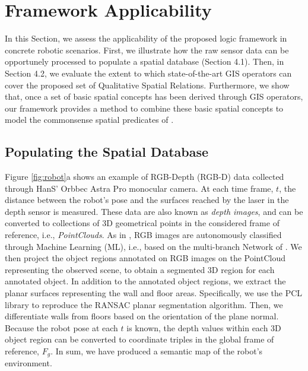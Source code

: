 \documentclass{article}
\begin{document}
\section{Framework Applicability}
In this Section, we assess the applicability of the proposed logic framework in concrete robotic scenarios. First, we illustrate how the raw sensor data can be opportunely processed to populate a spatial database (Section 4.1). Then, in Section 4.2, we evaluate the extent to which state-of-the-art GIS operators can cover the proposed set of Qualitative Spatial Relations. Furthermore, we show that, once a set of basic spatial concepts has been derived through GIS operators, our framework provides a method to combine these basic spatial concepts to model the commonsense spatial predicates of \cite{landau_what_1993}. 

\subsection{Populating the Spatial Database}
Figure \ref{fig:robot}a shows an example of RGB-Depth (RGB-D) data collected through HanS' Orbbec Astra Pro monocular camera. %
At each time frame, $t$, the distance between the robot's pose and the surfaces reached by the laser in the depth sensor is measured. These data are also known as \textit{depth images}, and can be converted to collections of 3D geometrical points in the considered frame of reference, i.e., \textit{PointClouds}. %
As in \cite{chiatti2021aaaimake}, RGB images are autonomously classified through Machine Learning (ML), i.e., based on the multi-branch Network of \cite{zeng2018robotic}. We then project the object regions annotated on RGB images on the PointCloud representing the observed scene, to obtain a segmented 3D region for each annotated object. 
In addition to the annotated object regions, we extract the planar surfaces representing the wall and floor areas. Specifically, we use the PCL library \cite{rusu2011pcl} to reproduce the RANSAC planar segmentation algorithm. Then, we differentiate walls from floors based on the orientation of the plane normal. 
Because the robot pose at each $t$ is known, the depth values within each 3D object region can be converted to coordinate triples in the global frame of reference, $F_g$. In sum, we have produced a semantic map of the robot's environment. 
\end{document}
